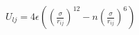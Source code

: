 \documentclass[a4paper,10pt]{article}
\begin{document}

$U_{lj} = 4 \epsilon \left(\left( \frac{\sigma}{r_{ij}}\right)^{12} - n\left(\frac{\sigma}{r_{ij}}\right)^{6} \right) $



\end{document}
